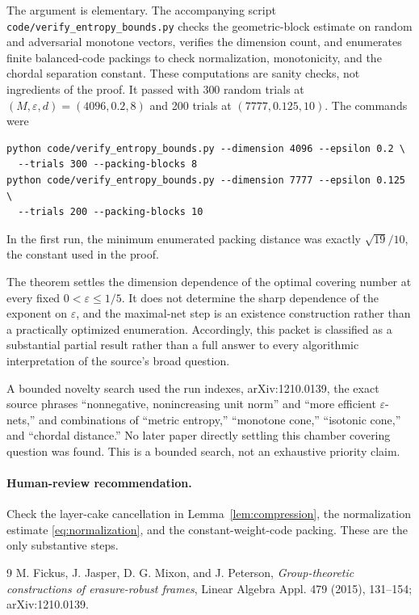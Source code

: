 \documentclass[11pt]{article}
\begin{document}
The argument is elementary.  The accompanying script
\texttt{code/verify\_entropy\_bounds.py} checks the geometric-block estimate on
random and adversarial monotone vectors, verifies the dimension count, and
enumerates finite balanced-code packings to check normalization, monotonicity,
and the chordal separation constant.  These computations are sanity checks,
not ingredients of the proof.  It passed with 300 random trials at
$(M,\varepsilon,d)=(4096,0.2,8)$ and 200 trials at
$(7777,0.125,10)$.  The commands were
\begin{verbatim}
python code/verify_entropy_bounds.py --dimension 4096 --epsilon 0.2 \
  --trials 300 --packing-blocks 8
python code/verify_entropy_bounds.py --dimension 7777 --epsilon 0.125 \
  --trials 200 --packing-blocks 10
\end{verbatim}
In the first run, the minimum enumerated packing distance was exactly
$\sqrt{19}/10$, the constant used in the proof.

The theorem settles the dimension dependence of the optimal covering number at
every fixed $0<\varepsilon\leq1/5$.  It does not determine the sharp dependence
of the exponent on $\varepsilon$, and the maximal-net step is an existence
construction rather than a practically optimized enumeration.  Accordingly,
this packet is classified as a substantial partial result rather than a full
answer to every algorithmic interpretation of the source's broad question.

A bounded novelty search used the run indexes, arXiv:1210.0139, the exact source
phrases ``nonnegative, nonincreasing unit norm'' and ``more efficient
$\varepsilon$-nets,'' and combinations of ``metric entropy,'' ``monotone
cone,'' ``isotonic cone,'' and ``chordal distance.''  No later paper directly
settling this chamber covering question was found.  This is a bounded search,
not an exhaustive priority claim.

\paragraph{Human-review recommendation.}
Check the layer-cake cancellation in Lemma~\ref{lem:compression}, the
normalization estimate \eqref{eq:normalization}, and the constant-weight-code
packing.  These are the only substantive steps.

\begin{thebibliography}{9}
M. Fickus, J. Jasper, D. G. Mixon, and J. Peterson,
\emph{Group-theoretic constructions of erasure-robust frames},
Linear Algebra Appl. 479 (2015), 131--154; arXiv:1210.0139.
\end{thebibliography}
\end{document}
